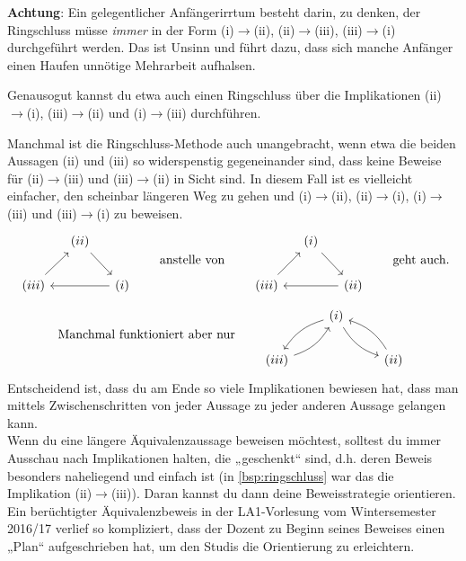 \begin{bem}
    \textbf{Achtung}: Ein gelegentlicher Anfängerirrtum besteht darin, zu denken, der Ringschluss müsse \emph{immer} in der Form (i)$\to$(ii), (ii)$\to$(iii), (iii)$\to$(i) durchgeführt werden. Das ist Unsinn und führt dazu, dass sich manche Anfänger einen Haufen unnötige Mehrarbeit aufhalsen.
    
    Genausogut kannst du etwa auch einen Ringschluss über die Implikationen (ii)$\to$(i), (iii)$\to$(ii) und (i)$\to$(iii) durchführen.
    
    Manchmal ist die Ringschluss-Methode auch unangebracht, wenn etwa die beiden Aussagen (ii) und (iii) so widerspenstig gegeneinander sind, dass keine Beweise für (ii)$\to$(iii) und (iii)$\to$(ii) in Sicht sind. In diesem Fall ist es vielleicht einfacher, den scheinbar längeren Weg zu gehen und (i)$\to$(ii), (ii)$\to$(i), (i)$\to$(iii) und (iii)$\to$(i) zu beweisen.
    \[\begin{tikzcd}[column sep=small]
        & (ii) \ar[rd] & \\
        (iii)\ar[ru] && (i)\ar[ll]
    \end{tikzcd}\qquad\text{anstelle von}\qquad\begin{tikzcd}[column sep=small]
        & (i) \ar[rd] & \\
        (iii)\ar[ru] && (ii)\ar[ll]    
    \end{tikzcd}\qquad\text{geht auch.}\]
    \[\text{Manchmal funktioniert aber nur}\qquad \begin{tikzcd}
        & (i) \ar[ld, bend right=20]  \ar[rd, bend right=20] & \\
        (iii)\ar[ru, bend right=20] && (ii) \ar[lu, bend right=20]
    \end{tikzcd}\]
    Entscheidend ist, dass du am Ende so viele Implikationen bewiesen hat, dass man mittels Zwischenschritten von jeder Aussage zu jeder anderen Aussage gelangen kann. \\[0.5em]
    Wenn du eine längere Äquivalenzaussage beweisen möchtest, solltest du immer Ausschau nach Implikationen halten, die „geschenkt“ sind, d.h. deren Beweis besonders naheliegend und einfach ist (in \cref{bsp:ringschluss} war das die Implikation (ii)$\to$(iii)). Daran kannst du dann deine Beweisstrategie orientieren. Ein berüchtigter Äquivalenzbeweis in der LA1-Vorlesung vom Wintersemester 2016/17 verlief so kompliziert, dass der Dozent zu Beginn seines Beweises einen „Plan“ aufgeschrieben hat, um den Studis die Orientierung zu erleichtern.
    \begin{figure}[ht]

\end{figure}
\end{bem}
